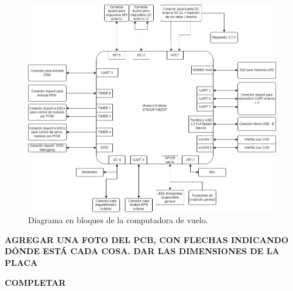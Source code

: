 \begin{figure}[H]
    \centering
    \includegraphics[width=\textwidth]{img/diagrama_en_bloques_computadora_de_vuelo.png}
    \caption{Diagrama en bloques de la computadora de vuelo.}
    \label{fig:diagrama_en_bloques_computadora_de_vuelo}
\end{figure}

\textbf{{\color{red} AGREGAR UNA FOTO DEL PCB, CON FLECHAS INDICANDO DÓNDE ESTÁ CADA COSA. DAR LAS DIMENSIONES DE LA PLACA}}

\textbf{{\color{red} COMPLETAR}}